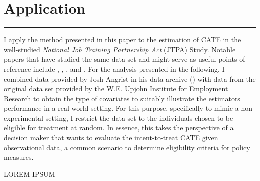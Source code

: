 \section{Application}\label{sec:application}
\hrule

I apply the method presented in this paper to the estimation of CATE in the well-studied \textit{National Job Training Partnership Act} (JTPA) Study.
Notable papers that have studied the same data set and might serve as useful points of reference include \citet{bloom_benefits_1997}, \citet{heckman_matching_1997}, \citet{abadie_instrumental_2002}, and \citet{kitagawa_who_2018}.
For the analysis presented in the following, I combined data provided by Josh Angrist in his data archive (\citet{abadie_replication_2008}) with data from the original data set provided by the W.E. Upjohn Institute for Employment Research to obtain the type of covariates to suitably illustrate the estimators performance in a real-world setting.
For this purpose, specifically to mimic a non-experimental setting, I restrict the data set to the individuals chosen to be eligible for treatment at random.
In essence, this takes the perspective of a decision maker that wants to evaluate the intent-to-treat CATE given observational data, a common scenario to determine eligibility criteria for policy measures.

{\color{red} LOREM IPSUM}